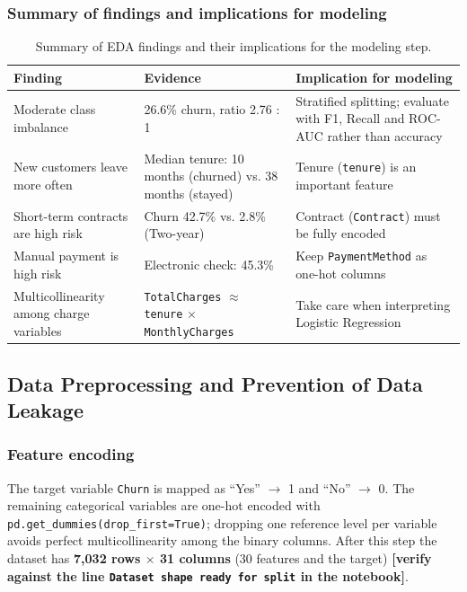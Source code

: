 \subsubsection{Summary of findings and implications for modeling}

\begin{table}[htbp]
\centering
\begin{center}
\small
\begin{tabularx}{\textwidth}{|p{}|p{}|p{}|}
\hline
\textbf{Finding} & \textbf{Evidence} & \textbf{Implication for modeling} \\
\hline
Moderate class imbalance & 26.6\% churn, ratio 2.76 : 1 & Stratified splitting; evaluate with F1, Recall and ROC-AUC rather than accuracy \\
\hline
New customers leave more often & Median tenure: 10 months (churned) vs. 38 months (stayed) & Tenure (\texttt{tenure}) is an important feature \\
\hline
Short-term contracts are high risk & Churn 42.7\% vs. 2.8\% (Two-year) & Contract (\texttt{Contract}) must be fully encoded \\
\hline
Manual payment is high risk & Electronic check: 45.3\% & Keep \texttt{PaymentMethod} as one-hot columns \\
\hline
Multicollinearity among charge variables & \texttt{TotalCharges} $\approx$ \texttt{tenure} $\times$ \texttt{MonthlyCharges} & Take care when interpreting Logistic Regression \\
\hline
\end{tabularx}
\end{center}
\caption{Summary of EDA findings and their implications for the modeling step.}
\label{tab:eda_summary}
\end{table}

\subsection{Data Preprocessing and Prevention of Data Leakage}

\subsubsection{Feature encoding}

The target variable \texttt{Churn} is mapped as ``Yes'' $\to$ 1 and ``No'' $\to$ 0. The remaining categorical variables are one-hot encoded with \texttt{pd.get\_dummies(drop\_first=True)}; dropping one reference level per variable avoids perfect multicollinearity among the binary columns. After this step the dataset has \textbf{7,032 rows $\times$ 31 columns} (30 features and the target) \textbf{[verify against the line \texttt{Dataset shape ready for split} in the notebook]}.


